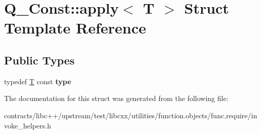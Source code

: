 \hypertarget{struct_q___const_1_1apply}{}\section{Q\+\_\+\+Const\+:\+:apply$<$ T $>$ Struct Template Reference}
\label{struct_q___const_1_1apply}
\subsection*{Public Types}
\begin{DoxyCompactItemize}
\item 
\mbox{\label{struct_q___const_1_1apply_aacb2e19bcf9c43947e88e10bc92b689f}} 
typedef \mbox{\hyperlink{struct_t}{T}} const {\bfseries type}
\end{DoxyCompactItemize}


The documentation for this struct was generated from the following file\+:\begin{DoxyCompactItemize}
\item 
contracts/libc++/upstream/test/libcxx/utilities/function.\+objects/func.\+require/invoke\+\_\+helpers.\+h\end{DoxyCompactItemize}
